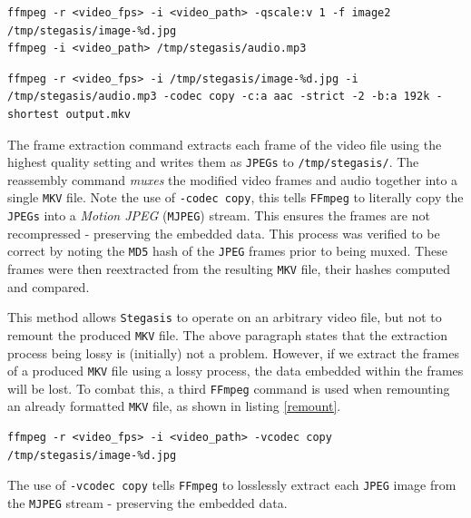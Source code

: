 \documentclass[paper=a4, fontsize=11pt,twoside]{scrartcl}    %
\numberwithin{table}{section}
\numberwithin{figure}{section}
\numberwithin{algorithm}{section}
\begin{document}
\begin{lstlisting}[caption={\texttt{FFmpeg} frame extraction command.}, frame=single, label=extract,upquote=true,float,floatplacement=H]
ffmpeg -r <video_fps> -i <video_path> -qscale:v 1 -f image2 /tmp/stegasis/image-%d.jpg
ffmpeg -i <video_path> /tmp/stegasis/audio.mp3
\end{lstlisting}

\begin{lstlisting}[caption={\texttt{FFmpeg} video reassembly command.}, frame=single, label=assembly,upquote=true,float,floatplacement=H]
ffmpeg -r <video_fps> -i /tmp/stegasis/image-%d.jpg -i /tmp/stegasis/audio.mp3 -codec copy -c:a aac -strict -2 -b:a 192k -shortest output.mkv
\end{lstlisting}

The frame extraction command extracts each frame of the video file using the highest quality setting and writes them as \texttt{JPEGs} to \texttt{/tmp/stegasis/}. The reassembly command \textit{muxes} the modified video frames and audio together into a single \texttt{MKV} file. Note the use of \texttt{-codec copy}, this tells \texttt{FFmpeg} to literally copy the \texttt{JPEGs} into a \textit{Motion JPEG} (\texttt{MJPEG}) stream. This ensures the frames are not recompressed - preserving the embedded data. This process was verified to be correct by noting the \texttt{MD5} hash of the \texttt{JPEG} frames prior to being muxed. These frames were then reextracted from the resulting \texttt{MKV} file, their hashes computed and compared.

This method allows \texttt{Stegasis} to operate on an arbitrary video file, but not to remount the produced \texttt{MKV} file. The above paragraph states that the extraction process being lossy is (initially) not a problem. However, if we extract the frames of a produced \texttt{MKV} file using a lossy process, the data embedded within the frames will be lost. To combat this, a third \texttt{FFmpeg} command is used when remounting an already formatted \texttt{MKV} file, as shown in listing \ref{remount}.

\begin{lstlisting}[caption={\texttt{FFmpeg} \texttt{MKV} \texttt{MJPEG} fram extraction command.}, frame=single, label=remount,upquote=true]
ffmpeg -r <video_fps> -i <video_path> -vcodec copy /tmp/stegasis/image-%d.jpg
\end{lstlisting}

The use of \texttt{-vcodec copy} tells \texttt{FFmpeg} to losslessly extract each \texttt{JPEG} image from the \texttt{MJPEG} stream - preserving the embedded data.
\end{document}
